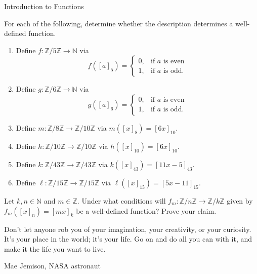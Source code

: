 \begin{section}{Introduction to Functions}
\begin{problem}\label{prob:well defined}
For each of the following, determine whether the description determines a well-defined function.
\begin{enumerate}[label=\textrm{(\alph*)}]
\item Define $f:\mathbb{Z}/5\mathbb{Z}\to \mathbb{N}$ via
\[
f([a]_5)=\begin{cases}
0, & \mbox{if } a\mbox{ is even}\\
1, & \mbox{if } a\mbox{ is odd}.
\end{cases}
\]
\item Define $g:\mathbb{Z}/6\mathbb{Z}\to \mathbb{N}$ via
\[
g([a]_6)=\begin{cases}
0, & \mbox{if } a\mbox{ is even}\\
1, & \mbox{if } a\mbox{ is odd}.
\end{cases}
\]
\item\label{mod 8 to mod 10} Define $m:\mathbb{Z}/8\mathbb{Z}\to \mathbb{Z}/10\mathbb{Z}$ via $m([x]_{8})=[6x]_{10}$.
\item\label{mod 10 to mod 10} Define $h:\mathbb{Z}/10\mathbb{Z}\to \mathbb{Z}/10\mathbb{Z}$ via $h([x]_{10})=[6x]_{10}$.
\item\label{mod 43 to mod 43} Define $k:\mathbb{Z}/43\mathbb{Z}\to \mathbb{Z}/43\mathbb{Z}$ via $k([x]_{43})=[11x-5]_{43}$.
\item\label{mod 15 to mod 15} Define $\ell:\mathbb{Z}/15\mathbb{Z}\to \mathbb{Z}/15\mathbb{Z}$ via $\ell([x]_{15})=[5x-11]_{15}$.
\end{enumerate}
\end{problem}

\begin{problem}
Let $k,n\in\mathbb{N}$ and $m\in\mathbb{Z}$. Under what conditions will $f_m: \mathbb{Z}/n\mathbb{Z}\to \mathbb{Z}/k\mathbb{Z}$ given by $f_m([x]_n) = [mx]_k$ be a well-defined function?  Prove your claim.
\end{problem}

\epigraph{Don't let anyone rob you of your imagination, your creativity, or your curiosity. It's your place in the world; it's your life. Go on and do all you can with it, and make it the life you want to live.}{Mae Jemison, NASA astronaut}

\end{section}